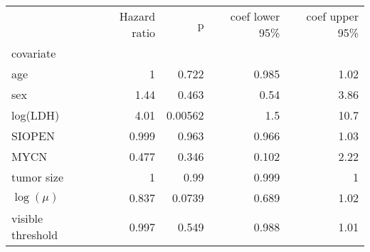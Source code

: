 \begin{tabular}{lrrrr}
\toprule
{} &  Hazard ratio &       p &  coef lower 95\% &  coef upper 95\% \\
covariate         &               &         &                  &                  \\
\midrule
age               &             1 &   0.722 &            0.985 &             1.02 \\
sex               &          1.44 &   0.463 &             0.54 &             3.86 \\
log(LDH)          &          4.01 & 0.00562 &              1.5 &             10.7 \\
SIOPEN            &         0.999 &   0.963 &            0.966 &             1.03 \\
MYCN              &         0.477 &   0.346 &            0.102 &             2.22 \\
tumor size        &             1 &    0.99 &            0.999 &                1 \\
$\log(\mu)$       &         0.837 &  0.0739 &            0.689 &             1.02 \\
visible threshold &         0.997 &   0.549 &            0.988 &             1.01 \\
\bottomrule
\end{tabular}
